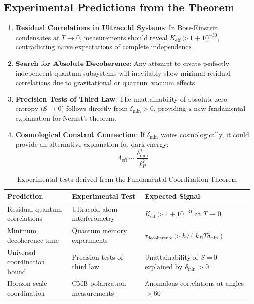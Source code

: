 \documentclass[11pt,a4paper]{article}
\begin{document}
\subsection{Experimental Predictions from the Theorem}

\begin{enumerate}
	\item \textbf{Residual Correlations in Ultracold Systems}: In Bose-Einstein condensates at $T \to 0$, measurements should reveal $K_{\mathrm{eff}} > 1 + 10^{-30}$, contradicting naive expectations of complete independence.
	
	\item \textbf{Search for Absolute Decoherence}: Any attempt to create perfectly independent quantum subsystems will inevitably show minimal residual correlations due to gravitational or quantum vacuum effects.
	
	\item \textbf{Precision Tests of Third Law}: The unattainability of absolute zero entropy ($S \to 0$) follows directly from $\delta_{\min} > 0$, providing a new fundamental explanation for Nernst's theorem.
	
	\item \textbf{Cosmological Constant Connection}: If $\delta_{\min}$ varies cosmologically, it could provide an alternative explanation for dark energy:
	\begin{equation}
		\Lambda_{\mathrm{eff}} \sim \frac{\delta_{\min}^2}{\ell_P^2}
	\end{equation}
\end{enumerate}

\begin{table}[htbp]
	\centering
	\small
	\begin{tabular}{p{}p{}p{}}
		\toprule
		\textbf{Prediction} & \textbf{Experimental Test} & \textbf{Expected Signal} \\
		\midrule
		Residual quantum correlations & Ultracold atom interferometry & $K_{\mathrm{eff}} > 1 + 10^{-30}$ at $T \to 0$ \\
		Minimum decoherence time & Quantum memory experiments & $\tau_{\text{decoherence}} > \hbar/(k_B T \delta_{\min})$ \\
		Universal coordination bound & Precision tests of third law & Unattainability of $S=0$ explained by $\delta_{\min}>0$ \\
		Horizon-scale coordination & CMB polarization measurements & Anomalous correlations at angles $>60^\circ$ \\
		\bottomrule
	\end{tabular}
	\caption{Experimental tests derived from the Fundamental Coordination Theorem}
	\label{tab:theorem-predictions}
\end{table}
\end{document}
